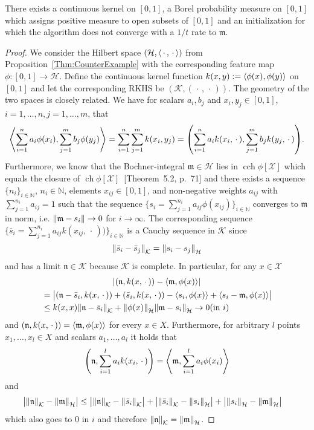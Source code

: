\documentclass[AHL,Unicode,longabstracts,published]{cedram}
\theoremstyle{remark}
\DeclareMathOperator{\cch}{cch}
\DeclareMathOperator{\ch}{ch}
\newcommand{\bbN}{\mathbb{N}}
\newcommand{\X}{\mathcal{X}}
\newcommand{\cH}{\mathcal{H}}
\newcommand{\clK}{\mathcal{K}}
\newcommand{\fkn}{\mathfrak{n}}
\newcommand{\mean}{\mathfrak{m}}
\providecommand{\abs}[1]{\left\lvert#1\right\rvert}
\providecommand{\norm}[1]{\left\lVert#1\right\rVert}
\providecommand{\inner}[2]{\left\langle #1,#2\right\rangle}
\let\originalleft\left
\let\originalright\right
\renewcommand{\left}{\mathopen{}\mathclose\bgroup\originalleft}
\renewcommand{\right}{\aftergroup\egroup\originalright}
\begin{document}
\begin{coro}
There exists a continuous kernel on $[0,1]$, a Borel probability measure on $[0,1]$ which assigns positive measure to open subsets of $[0,1]$ and an initialization for which the algorithm does not converge with a $1/t$ rate to $\mean$.
\end{coro}
\begin{proof}
We consider the Hilbert space $(\cH,\inner{\,\cdot\,}{\,\cdot\,})$ from Proposition~\ref{Thm:CounterExample} with the corresponding feature map $\phi:[0,1] \rightarrow \cH$. Define the continuous kernel function $k(x,y) := \inner{\phi(x)}{\phi(y)}$ on $[0,1]$ and let the corresponding RKHS be $(\clK,(\,\cdot\,,\,\cdot\,))$. The geometry of the two spaces is closely related. We have for scalars $a_i, b_j$ and $x_i, y_j \in [0,1]$, $i=1,\dots,n, j=1, \dots, m$, that
\begin{align*}
\inner{\sum_{i=1}^n a_i \phi(x_i)}{\sum_{j=1}^m b_j \phi(y_j)} = \sum_{i=1}^n \sum_{j=1}^m k(x_i,y_j) =
\left(\sum_{i=1}^n a_i k(x_i,\,\cdot\,),\sum_{j=1}^m b_j k(y_j,\,\cdot\,)\right).
\end{align*}
Furthermore, we know that the Bochner-integral $\mean \in \cH$ lies in $\cch \phi[\X]$ which equals the closure of $\ch \phi[\X]$~\cite{SIM11}[Theorem~5.2, p.~71] and there exists a sequence $\{n_i\}_{i \in \bbN}$, $n_i \in \bbN$, elements $x_{ij} \in [0,1]$, and non-negative weights $a_{ij}$ with $\sum_{j=1}^{n_i} a_{ij} =1$ such that the sequence $\{s_i = \sum_{j=1}^{n_i} a_{ij} \phi(x_{ij})\}_{i\in \bbN}$ converges to $\mean$ in norm, i.e. $\norm{\mean - s_i} \rightarrow 0$ for $i\rightarrow \infty$. The corresponding sequence $\{\bar s_i = \sum_{j=1}^{n_i} a_{ij} k(x_{ij},\,\cdot\,))\}_{i\in \bbN}$ is a Cauchy sequence in $\clK$ since
\[
\norm{\bar s_i - \bar s_j}_\clK = \norm{s_i - s_j}_\cH
\]
and has a limit $\fkn \in \clK$ because $\clK$ is complete. In particular, for any $x \in \X$
\begin{multline*}
\abs{ \left(\fkn, k(x,\,\cdot\,)\right) - \inner{\mean}{\phi(x)}}\\
\begin{aligned}
&=
\bigl|(\fkn - \bar s_i,k(x,\,\cdot\,)) + (\bar s_i,k(x,\,\cdot\,)) - \inner{s_i}{\phi(x)} + \inner{s_i - \mean}{\phi(x)}\bigr| \\
&\leq k(x,x) \norm{\fkn - \bar s_i}_\clK + \norm{\phi(x)}_\cH \norm{\mean - s_i}_\cH \rightarrow 0 (\text{in } i)
\end{aligned}
\end{multline*}
and $(\fkn,k(x,\,\cdot\,)) = \inner{\mean}{\phi(x)}$ for every $x \in X$. Furthermore, for arbitrary $l$ points $x_1,\dots, x_l \in X$ and scalars $a_1,\dots,a_l$ it holds that
\[
\left(\fkn,\sum_{i=1}^l a_i k(x_i,\,\cdot\,)\right) =\left\langle \mean,\sum_{i=1}^l a_i \phi(x_i)\right\rangle
\] 
and
\begin{align*}
\bigl|\norm{\fkn}_\clK - \norm{\mean}_\cH\bigr|  &\leq \bigl|\norm{\fkn}_\clK - \norm{\bar s_i}_\clK\bigr| + \bigl|\norm{\bar s_i}_\clK - \norm{s_i}_\cH \bigr| + \bigl|\norm{s_i}_\cH - \norm{\mean}_\cH \bigr|
\end{align*}
which also goes to $0$ in $i$ and therefore $\norm{\fkn}_\clK = \norm{\mean}_\cH$.


\end{proof}
\end{document}
